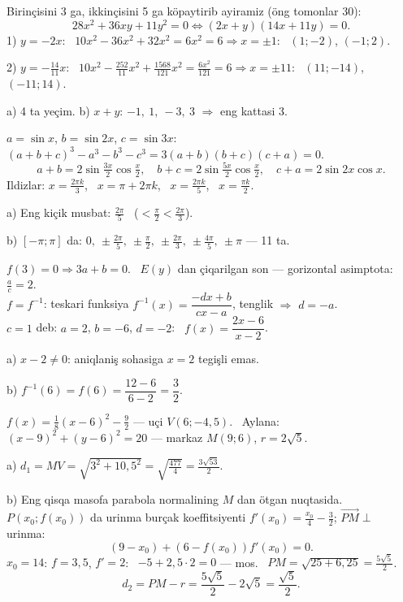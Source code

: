 \newpage
{}
Birinçisini 3 ga, ikkinçisini 5 ga köpaytirib ayiramiz (öng tomonlar 30):
\[28x^2+36xy+11y^2=0\iff(2x+y)(14x+11y)=0.\]
1) $y=-2x$: \ $10x^2-36x^2+32x^2=6x^2=6\Rightarrow x=\pm1$: \ $(1;-2)$, $(-1;2)$.

2) $y=-\frac{14}{11}x$: \ $10x^2-\frac{252}{11}x^2+\frac{1568}{121}x^2=\frac{6x^2}{121}=6\Rightarrow x=\pm11$: \ $(11;-14)$, $(-11;14)$.

a) 4 ta yeçim. \qquad b) $x+y$: $-1,\ 1,\ -3,\ 3$ $\Rightarrow$ eng kattasi 3.

\newpage
{}
$a=\sin x$, $b=\sin2x$, $c=\sin3x$: \ $(a+b+c)^3-a^3-b^3-c^3=3(a+b)(b+c)(c+a)=0$.
\[a+b=2\sin\tfrac{3x}2\cos\tfrac x2,\quad b+c=2\sin\tfrac{5x}2\cos\tfrac x2,\quad c+a=2\sin2x\cos x.\]
Ildizlar: $x=\frac{2\pi k}3$, \ $x=\pi+2\pi k$, \ $x=\frac{2\pi k}5$, \ $x=\frac{\pi k}2$.

a) Eng kiçik musbat: $\frac{2\pi}5$ \ ($<\frac\pi2<\frac{2\pi}3$).

b) $[-\pi;\pi]$ da: $0,\ \pm\frac{2\pi}5,\ \pm\frac\pi2,\ \pm\frac{2\pi}3,\ \pm\frac{4\pi}5,\ \pm\pi$ — 11 ta.

\newpage
{}
$f(3)=0\Rightarrow3a+b=0$. \ $E(y)$ dan çiqarilgan son — gorizontal asimptota: $\frac ac=2$.\\
$f=f^{-1}$: teskari funksiya $f^{-1}(x)=\dfrac{-dx+b}{cx-a}$, tenglik $\Rightarrow$ $d=-a$.\\
$c=1$ deb: $a=2$, $b=-6$, $d=-2$: \ $f(x)=\dfrac{2x-6}{x-2}$.

a) $x-2\ne0$: aniqlaniş sohasiga $x=2$ tegişli emas.

b) $f^{-1}(6)=f(6)=\dfrac{12-6}{6-2}=\dfrac32$.

\newpage
{}
$f(x)=\frac18(x-6)^2-\frac92$ — uçi $V(6;-4{,}5)$. \ Aylana: $(x-9)^2+(y-6)^2=20$ — markaz $M(9;6)$, $r=2\sqrt5$.

a) $d_1=MV=\sqrt{3^2+10{,}5^2}=\sqrt{\frac{477}4}=\frac{3\sqrt{53}}2$.

b) Eng qisqa masofa parabola normalining $M$ dan ötgan nuqtasida. $P(x_0;f(x_0))$ da urinma burçak koeffitsiyenti $f'(x_0)=\frac{x_0}4-\frac32$; $\overrightarrow{PM}\perp$ urinma:
\[(9-x_0)+(6-f(x_0))f'(x_0)=0.\]
$x_0=14$: $f=3{,}5$, $f'=2$: \ $-5+2{,}5\cdot2=0$ — mos. \ $PM=\sqrt{25+6{,}25}=\frac{5\sqrt5}2$.
\[d_2=PM-r=\frac{5\sqrt5}2-2\sqrt5=\frac{\sqrt5}2.\]

